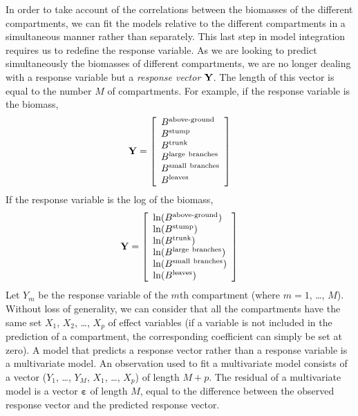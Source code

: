 In order to take account of the correlations between the biomasses of the different compartments, we can fit the models relative to the different compartments in a simultaneous manner rather than separately. This last step in model integration requires us to redefine the response variable. As we are looking to predict simultaneously the biomasses of different compartments, we are no longer dealing with a response variable but a \emph{response vector} $\mathbf{Y}$. The length of this vector is equal to the number $M$ of compartments. For example, if the response variable is the biomass,
\[
\vect{Y}=\left[
\begin{array}{l}
B^{\mbox{\scriptsize above-ground}}\\ %
B^{\mathrm{stump}}\\ %
B^{\mathrm{trunk}}\\ %
B^{\mathrm{large\ branches}}\\ %
B^{\mathrm{small\ branches}}\\ %
B^{\mathrm{leaves}}
\end{array}
\right]
\]
If the response variable is the log of the biomass,
\[
\vect{Y}=\left[
\begin{array}{l}
\ln(B^{\mbox{\scriptsize above-ground}})\\ %
\ln(B^{\mathrm{stump}})\\ %
\ln(B^{\mathrm{trunk}})\\ %
\ln(B^{\mathrm{large\ branches}})\\ %
\ln(B^{\mathrm{small\ branches}})\\ %
\ln(B^{\mathrm{leaves}})
\end{array}
\right]
\]
Let $Y_m$ be the response variable of the $m$th compartment
(where $m=1$, \ldots, $M$). Without loss of generality, we can consider that all the compartments have the same set $X_1$, $X_2$, \ldots, $X_p$ of effect variables (if a variable is not included in the prediction of a compartment, the corresponding coefficient can simply be set at zero). A model that predicts a response vector rather than a response variable is a multivariate model. An observation used to fit a multivariate model consists of a vector ($Y_1$, \ldots, $Y_M$, $X_1$, \ldots, $X_p$) of length $M+p$. The residual of a multivariate model is a vector $\boldsymbol{\varepsilon}$ of length $M$, equal to the difference between the observed response vector and the predicted response vector.


